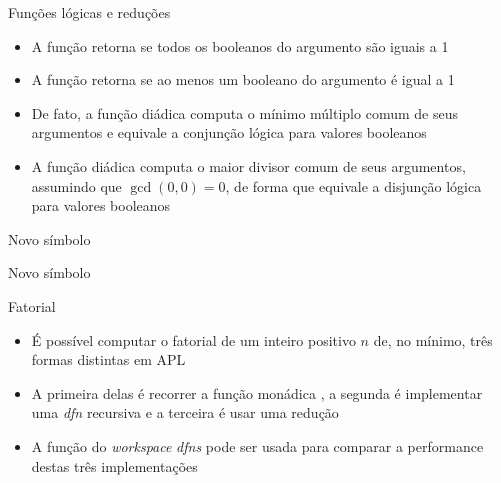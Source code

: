 \begin{frame}[fragile]{Funções lógicas e reduções}

    \begin{itemize}
        \item A função  retorna  se todos os booleanos do argumento são iguais a 1
        \pause

        \item A função  retorna  se ao menos um booleano do argumento é igual a 1
        \pause

        \item De fato, a função diádica  computa o mínimo múltiplo comum de seus argumentos e equivale a conjunção lógica para valores booleanos
        \pause

        \item A função diádica  computa o maior divisor comum de seus argumentos, assumindo que $\gcd(0, 0) = 0$, de forma que equivale a disjunção lógica para valores booleanos
    \end{itemize}
\end{frame}

\begin{frame}[fragile]{Novo símbolo}


\end{frame}

\begin{frame}[fragile]{Novo símbolo}

\end{frame}

\begin{frame}[fragile]{Fatorial}

    \begin{itemize}
        \item É possível computar o fatorial de um inteiro positivo $n$  de, no mínimo, três formas
            distintas em APL
        \pause

        \item A primeira delas é recorrer a função monádica , a segunda é 
            implementar uma \textit{dfn} recursiva e a terceira é usar uma redução
        \pause

        \item A função  do \textit{workspace} \textit{dfns} pode ser usada para
            comparar a performance destas três implementações
    \end{itemize}

\end{frame}

